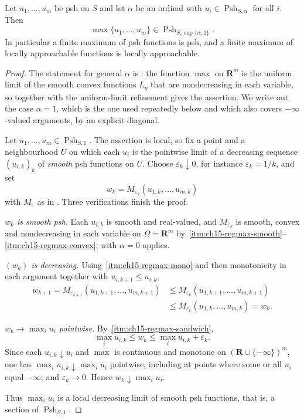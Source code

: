 \begin{proposition}
\label{prop:ch15-max-stability}
Let $u_1,\dots,u_m$ be psh on $S$ and let $\alpha$ be an ordinal with
$u_i\in\operatorname{Psh}_{S,\alpha}$ for all $i$.  Then
\[
 \max\{u_1,\dots,u_m\}\in\operatorname{Psh}_{S,\sup\{\alpha,1\}} .
\]
In particular a finite maximum of psh functions is psh, and a finite maximum
of locally approachable functions is locally approachable.
\end{proposition}

\begin{proof}
The statement for general $\alpha$ is \cite[Corollary~8.2.3]{CLD25}: the
function $\max$ on $\mathbf R^m$ is the uniform limit of the smooth convex
functions $L_\eta$ that are nondecreasing in each variable, so
 together with the uniform-limit refinement
\cite[Corollary~8.2.2]{CLD25} gives the assertion.  We write out the case
$\alpha=1$, which is the one used repeatedly below and which also covers
$-\infty$-valued arguments, by an explicit diagonal.

Let $u_1,\dots,u_m\in\operatorname{Psh}_{S,1}$.  The assertion is local, so
fix a point and a neighbourhood $U$ on which each $u_i$ is the pointwise
limit of a decreasing sequence $(u_{i,k})_k$ of \emph{smooth} psh functions
on $U$.  Choose $\varepsilon_k\downarrow0$, for instance
$\varepsilon_k=1/k$, and set
\[
 w_k=M_{\varepsilon_k}(u_{1,k},\dots,u_{m,k})
\]
with $M_\varepsilon$ as in .  Three verifications
finish the proof.

\emph{$w_k$ is smooth psh.}  Each $u_{i,k}$ is smooth and real-valued, and
$M_{\varepsilon_k}$ is smooth, convex and nondecreasing in each variable on
$\Omega=\mathbf R^m$ by
\,\cref{itm:ch15-regmax-smooth}--\cref{itm:ch15-regmax-convex};
 with $\alpha=0$ applies.

\emph{$(w_k)$ is decreasing.}  Using
\,\cref{itm:ch15-regmax-mono} and then monotonicity in
each argument together with $u_{i,k+1}\le u_{i,k}$,
\[
 \begin{aligned}
 w_{k+1}=M_{\varepsilon_{k+1}}(u_{1,k+1},\dots,u_{m,k+1})
 &\le M_{\varepsilon_k}(u_{1,k+1},\dots,u_{m,k+1})\\
 &\le M_{\varepsilon_k}(u_{1,k},\dots,u_{m,k})=w_k .
 \end{aligned}
\]

\emph{$w_k\to\max_iu_i$ pointwise.}  By
\,\cref{itm:ch15-regmax-sandwich},
\[
 \max_iu_{i,k}\le w_k\le\max_iu_{i,k}+\varepsilon_k .
\]
Since each $u_{i,k}\downarrow u_i$ and $\max$ is continuous and monotone on
$(\mathbf R\cup\{-\infty\})^m$, one has $\max_iu_{i,k}\downarrow\max_iu_i$
pointwise, including at points where some or all $u_i$ equal $-\infty$; and
$\varepsilon_k\to0$.  Hence $w_k\downarrow\max_iu_i$.

Thus $\max_iu_i$ is a local decreasing limit of smooth psh functions, that
is, a section of $\operatorname{Psh}_{S,1}$.
\end{proof}

